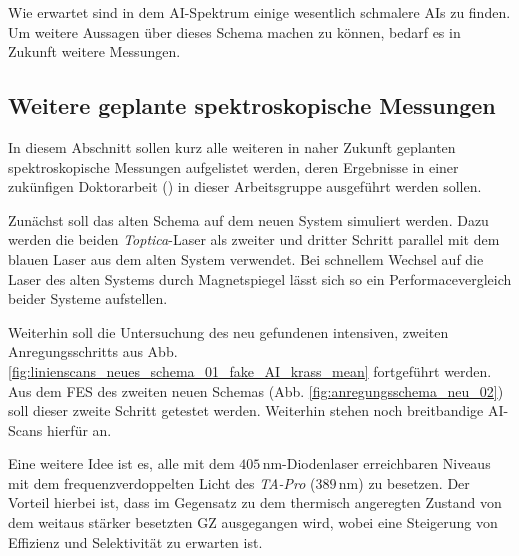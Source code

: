 % 		
Wie erwartet sind in dem AI-Spektrum einige wesentlich schmalere AIs zu finden.
Um weitere Aussagen über dieses Schema machen zu können, bedarf es in
Zukunft weitere Messungen.

\subsection{Weitere geplante spektroskopische
Messungen}\label{subsec:geplante_messungen}
In diesem Abschnitt sollen kurz alle weiteren in naher Zukunft geplanten
spektroskopische Messungen aufgelistet werden, deren Ergebnisse in einer
zukünfigen Doktorarbeit (\cite{hakimi:2012:dissertation}) in dieser Arbeitsgruppe ausgeführt werden
sollen.\par
Zunächst soll das alten Schema auf dem neuen System simuliert werden. Dazu
werden die beiden \textit{Toptica}-Laser als zweiter und dritter Schritt
parallel mit dem blauen Laser aus dem alten System verwendet. Bei schnellem
Wechsel auf die Laser des alten Systems durch Magnetspiegel lässt sich so ein
Performacevergleich beider Systeme aufstellen.\par
Weiterhin soll die Untersuchung des neu gefundenen intensiven, zweiten
Anregungsschritts aus Abb.
\ref{fig:linienscans_neues_schema_01_fake_AI_krass_mean} fortgeführt werden. Aus
dem FES des zweiten neuen Schemas
(Abb. \ref{fig:anregungsschema_neu_02}) soll dieser zweite Schritt getestet
werden. Weiterhin stehen noch breitbandige AI-Scans hierfür an.\par
Eine weitere Idee ist es, alle mit dem $405\,$nm-Diodenlaser erreichbaren
Niveaus mit dem frequenzverdoppelten Licht des \textit{TA-Pro} ($389\,$nm) zu
besetzen. Der Vorteil hierbei ist, dass im Gegensatz zu dem thermisch angeregten
Zustand von dem weitaus stärker besetzten GZ ausgegangen wird, wobei eine
Steigerung von Effizienz und Selektivität zu erwarten ist.

